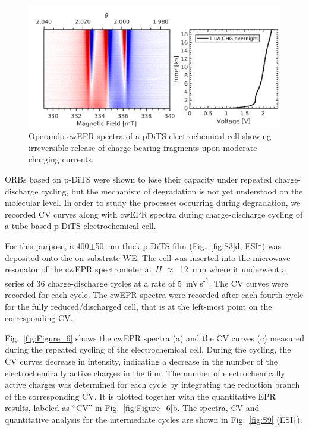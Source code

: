 \begin{figure}[!h]
\center
	\includegraphics[width=1\textwidth]{./operando_epr/figures/degradation/pDiTS_slow_charge_MS5000_forslides.png}
	\caption{Operando cwEPR spectra of a pDiTS electrochemical cell showing irreversible release of charge-bearing fragments upon moderate charging currents.}
	\label{fig:operando_degradation_3_lines_release}
\end{figure}



\par
ORBs based on p-DiTS were shown to lose their capacity under repeated charge-discharge cycling,\cite{vereshchagin2020} but the mechanism of degradation is not yet understood on the molecular level. In order to study the processes occurring during degradation, we recorded CV curves along with cwEPR spectra during charge-discharge cycling of a tube-based p-DiTS electrochemical cell.

\par
For this purpose, a 400$\pm$50~nm thick p-DiTS film (Fig.~\ref{fig:S3}d, ESI$\dag$) was deposited onto the on-substrate WE. The cell was inserted into the microwave resonator of the cwEPR spectrometer at $H$ $\approx$~12~mm where it underwent a series of 36 charge-discharge cycles at a rate of 5~mV\,s\textsuperscript{-1}. The CV curves were recorded for each cycle. The cwEPR spectra were recorded after each fourth cycle for the fully reduced/discharged cell, that is at the left-most point on the corresponding CV.

\par
Fig.~\ref{fig:Figure_6} shows the cwEPR spectra (a) and the CV curves (c) measured during the repeated cycling of the electrochemical cell. During the cycling, the CV curves decrease in intensity, indicating a decrease in the number of the electrochemically active charges in the film. The number of electrochemically active charges was determined for each cycle by integrating the reduction branch of the corresponding CV. It is plotted together with the quantitative EPR results, labeled as ``CV'' in Fig.~\ref{fig:Figure_6}b. The spectra, CV and quantitative analysis for the intermediate cycles are shown in Fig.~\ref{fig:S9} (ESI$\dag$).


